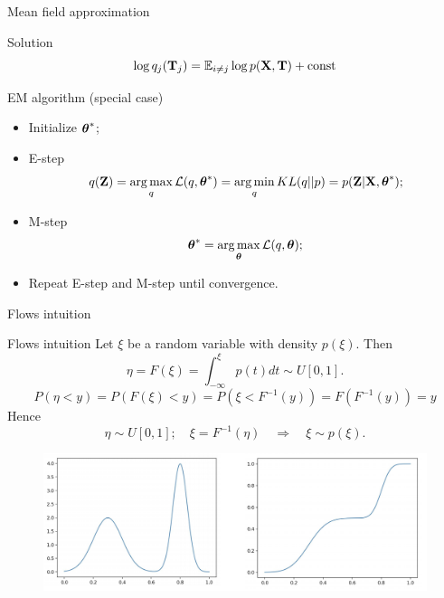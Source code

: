 \begin{frame}{Mean field approximation}
    \begin{block}{Solution}
    \[
        \log q_j(\mathbf{T}_j) = \mathbb{E}_{i \neq j} \log p(\mathbf{X}, \mathbf{T}) + \text{const}
    \]
    \end{block}

	\begin{block}{EM algorithm (special case)}
	\begin{itemize}
		\item Initialize $\boldsymbol{\theta}^*$;
		\item E-step
		\[
			q(\mathbf{Z}) = \operatorname*{arg\,max}_q \mathcal{L} (q, \boldsymbol{\theta}^*) = \operatorname*{arg\,min}_q KL(q || p) =
			 p(\mathbf{Z}| \mathbf{X}, \boldsymbol{\theta}^*);
		\]
		\item M-step
		\[
			\boldsymbol{\theta}^* = \operatorname*{arg\,max}_{\boldsymbol{\theta}} \mathcal{L} (q, \boldsymbol{\theta});
		\]
		\item Repeat E-step and M-step until convergence.
	\end{itemize}
	\end{block}
\end{frame}
\begin{frame}{Flows intuition}
\end{frame}
\begin{frame}{Flows intuition}
	Let $\xi$ be a random variable with density $p(\xi)$. Then
	\[
	\eta = F(\xi) = \int_{-\infty}^\xi p(t)dt \sim U[0, 1].
	\]
	\[
	P(\eta < y) = P(F(\xi) < y) = P(\xi < F^{-1}(y)) = F(F^{-1}(y)) = y
	\]
	Hence
	\[
	\eta \sim U[0, 1]; \quad \xi = F^{-1}(\eta) \quad \Rightarrow \quad \xi \sim p(\xi).
	\]
	\begin{figure}
		\includegraphics[width=\linewidth]{figs/flows_1d}
	\end{figure}
	
\end{frame}
